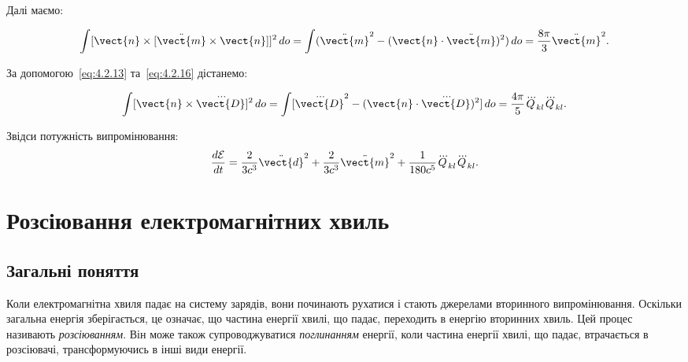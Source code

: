 Далі маємо:

\begin{equation*}
\int [\vect{n} \times [\ddot{\vect{m}}\times\vect{n}]]^2 \, do = \int (\ddot{\vect{m}}^2 - (\vect{n} \cdot \ddot{\vect{m}})^2) \, do =
\frac{8\pi}{3} \ddot{\vect{m}}^2.
\end{equation*}

За допомогою~\eqref{eq:4.2.13} та~\eqref{eq:4.2.16}  дістанемо:

\begin{equation*}
\int [\vect{n} \times \dddot{\vect{D}}]^2 \, do = \int [\dddot{\vect{D}}^2 - (\vect{n} \cdot \dddot{\vect{D}})^2] \, do = \frac{4\pi}{5}
\dddot{Q}_{kl} \dddot{Q}_{kl}.
\end{equation*}

Звідси потужність випромінювання:
\begin{equation*}
    \frac{d\mathcal{E}}{dt} = \frac2{3c^3}\ddot{\vect{d}}^2+
    \frac2{3c^3}\ddot{\vect{m}}^2+
    \frac1{180c^5}\dddot{Q}_{kl} \dddot{Q}_{kl}.
\end{equation*}

\section{Розсіювання електромагнітних хвиль}\label{sec:scattering}

\subsection*{Загальні поняття}

Коли електромагнітна хвиля падає на систему зарядів, вони починають рухатися і стають джерелами вторинного
випромінювання. Оскільки загальна енергія зберігається, це означає, що частина енергії хвилі, що падає, переходить в
енергію вторинних хвиль. Цей процес називають \emph{розсіюванням}. Він може також супроводжуватися \emph{поглинанням}
енергії, коли частина енергії хвилі, що падає, втрачається в розсіювачі, трансформуючись в інші види енергії.

